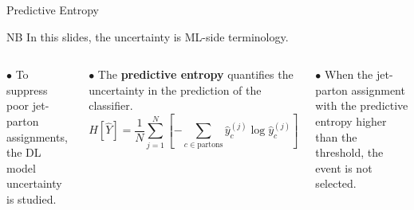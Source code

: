 \documentclass[10pt]{beamer}
\begin{document}



\begin{frame}[fragile]{Predictive Entropy}
    \begin{alertblock}{NB}
        {\footnotesize In this slides, the uncertainty is ML-side terminology.}
    \end{alertblock}
    
    \begin{columns}[T,onlytextwidth]

        $\bullet$ To suppress poor jet-parton assignments, the DL model uncertainty is studied.\\
        
        \medskip
        
        $\bullet$ The \textbf{predictive entropy} quantifies the uncertainty in the prediction of the classifier.
        \begin{equation*}
            H[\hat{Y}] = \frac{1}{N} \sum_{j=1}^{N} [ -\sum_{c \in \textrm{partons} } \hat{y}_{c}^{(j)} \log \hat{y}_{c}^{(j)} ]
        \end{equation*}
        
        $\bullet$ When the jet-parton assignment with the predictive entropy higher than the threshold, the event is not selected.


\end{columns}
\end{frame}
\end{document}
